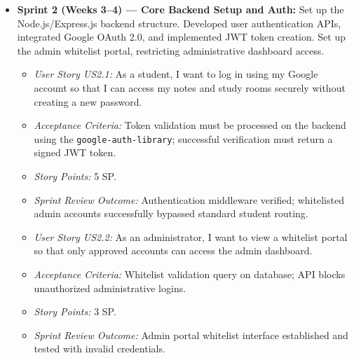 \documentclass[12,Times new Roman,a4paper]{report}
\begin{document}
\begin{itemize}
    \item \textbf{Sprint 2 (Weeks 3--4) --- Core Backend Setup and Auth:} Set up the Node.js/Express.js backend structure. Developed user authentication APIs, integrated Google OAuth 2.0, and implemented JWT token creation. Set up the admin whitelist portal, restricting administrative dashboard access.
    \begin{itemize}
        \item \textit{User Story US2.1:} As a student, I want to log in using my Google account so that I can access my notes and study rooms securely without creating a new password.
        \item \textit{Acceptance Criteria:} Token validation must be processed on the backend using the \texttt{google-auth-library}; successful verification must return a signed JWT token.
        \item \textit{Story Points:} 5 SP.
        \item \textit{Sprint Review Outcome:} Authentication middleware verified; whitelisted admin accounts successfully bypassed standard student routing.
    \end{itemize}
    \begin{itemize}
        \item \textit{User Story US2.2:} As an administrator, I want to view a whitelist portal so that only approved accounts can access the admin dashboard.
        \item \textit{Acceptance Criteria:} Whitelist validation query on database; API blocks unauthorized administrative logins.
        \item \textit{Story Points:} 3 SP.
        \item \textit{Sprint Review Outcome:} Admin portal whitelist interface established and tested with invalid credentials.
    \end{itemize}
    

\end{itemize}
\end{document}
